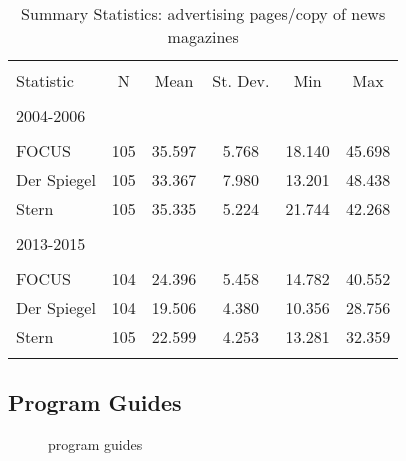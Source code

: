 \documentclass[12pt,a4paper]{scrreprt}
\begin{document}
\begin{appendices}
\begin{table}[!htbp] \centering 
  \caption{Summary Statistics: advertising pages/copy of news magazines} 
\begin{tabular}{@{\extracolsep{5pt}}lccccc} 
\\[-1.8ex]\hline 
\hline \\[-1.8ex] 
Statistic & \multicolumn{1}{c}{N} & \multicolumn{1}{c}{Mean} & \multicolumn{1}{c}{St. Dev.} & \multicolumn{1}{c}{Min} & \multicolumn{1}{c}{Max} \\ 
\hline \\[-1.8ex] 
2004-2006 \\
\hline \\[-1.8ex] 
FOCUS & 105 & 35.597 & 5.768 & 18.140 & 45.698 \\ 
Der Spiegel & 105 & 33.367 & 7.980 & 13.201 & 48.438 \\ 
Stern & 105 & 35.335 & 5.224 & 21.744 & 42.268 \\ 
\hline \\[-1.8ex] 
2013-2015 \\
\hline \\[-1.8ex] 
FOCUS & 104 & 24.396 & 5.458 & 14.782 & 40.552 \\ 
Der Spiegel & 104 & 19.506 & 4.380 & 10.356 & 28.756 \\ 
Stern & 105 & 22.599 & 4.253 & 13.281 & 32.359 \\ 
\hline \\[-1.8ex] 
\end{tabular} 
\end{table} 

\subsection{Program Guides}\label{appendix_sum_tv}

\begin{figure}[H]
\caption{program guides}
	\label{fig_tv}
\begin{minipage}
	\centering
	
\end{minipage}
\hfil
\begin{minipage}
	\centering
	
\end{minipage}
\end{figure}



\end{appendices}
\end{document}

